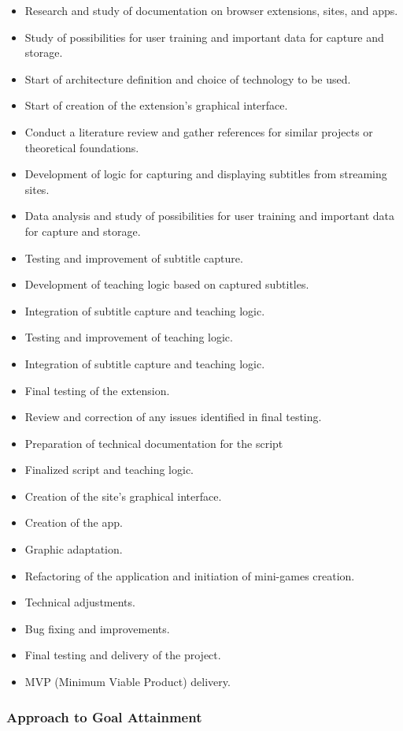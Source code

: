 \documentclass[12pt]{article}
\begin{document}
\begin{itemize}
\item Research and study of documentation on browser extensions, sites, and apps.
\item Study of possibilities for user training and important data for capture and storage.
\item Start of architecture definition and choice of technology to be used.
\item Start of creation of the extension's graphical interface.
\item Conduct a literature review and gather references for similar projects or theoretical foundations.
\item Development of logic for capturing and displaying subtitles from streaming sites.
\item Data analysis and study of possibilities for user training and important data for capture and storage.
\item Testing and improvement of subtitle capture.
\item Development of teaching logic based on captured subtitles.
\item Integration of subtitle capture and teaching logic.
\item Testing and improvement of teaching logic.
\item Integration of subtitle capture and teaching logic.
\item Final testing of the extension.
\item Review and correction of any issues identified in final testing.
\item Preparation of technical documentation for the script 
\item Finalized script and teaching logic.
\item Creation of the site's graphical interface.
\item Creation of the app. 
\item Graphic adaptation.
\item Refactoring of the application and initiation of mini-games creation.
\item Technical adjustments.
\item Bug fixing and improvements.
\item Final testing and delivery of the project.
\item MVP (Minimum Viable Product) delivery.
\end {itemize}

\subsubsection{Approach to Goal Attainment}
\end{document}
